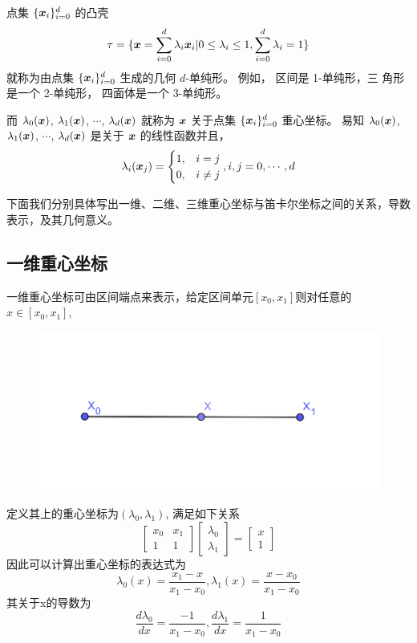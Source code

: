 点集 $\{{\boldsymbol x}_i\}_{i=0}^d$ 的凸壳
\begin{equation}
	\tau = \{{\boldsymbol x} = \sum_{i=0}^{d}\lambda_i{\boldsymbol x}_i | 0\leq \lambda_i \leq
	1, \sum_{i=0}^d\lambda_i = 1\}
\end{equation}
就称为由点集 $\{{\boldsymbol x}_i\}_{i=0}^d$ 生成的几何 $d$-单纯形。 例如， 区间是 1-单纯形，三
角形是一个 2-单纯形， 四面体是一个 3-单纯形。

而 $\lambda_0({\boldsymbol x})$, $\lambda_1({\boldsymbol x})$, $\cdots$, $\lambda_{d}({\boldsymbol x})$ 就称为
${\boldsymbol x}$
关于点集 $\{{\boldsymbol x}_i\}_{i=0}^d$ 重心坐标。  易知 $\lambda_0({\boldsymbol x})$,
$\lambda_1({\boldsymbol x})$, $\cdots$, $\lambda_{d}({\boldsymbol x})$ 是关于 ${\boldsymbol x}$ 的线性函数并且，
\begin{equation}
	\lambda_i({\boldsymbol x}_j) = 
	\begin{cases}
		1, & i = j\\
		0, & i\not= j
	\end{cases}, 
	i, j = 0, \cdots, d
\end{equation}

下面我们分别具体写出一维、二维、三维重心坐标与笛卡尔坐标之间的关系，导数表示，及其几何意义。
\subsection{一维重心坐标}
一维重心坐标可由区间端点来表示，给定区间单元$[x_0,x_1]$则对任意的$x \in [x_0,x_1]$,
\begin{figure}[H]
	\centering
	\includegraphics[width=0.7\linewidth]{figures/intervalbc}
	\label{fig:intervalbc}
\end{figure}
定义其上的重心坐标为$(\lambda_0,\lambda_1)$, 满足如下关系
\begin{equation}
	\left[\begin{array}{cc}
		x_{0} & x_{1} \\
		1 & 1
	\end{array}\right]\left[\begin{array}{l}
		\lambda_{0} \\
		\lambda_{1}
	\end{array}\right]=\left[\begin{array}{l}
		x \\
		1
	\end{array}\right]
\end{equation}
因此可以计算出重心坐标的表达式为
\begin{equation}
	\lambda_{0}(x)=\frac{x_{1}-x}{x_{1}-x_{0}}, \lambda_{1}(x)=\frac{x-x_{0}}{x_{1}-x_{0}}
\end{equation}
其关于x的导数为
\begin{equation}
	\frac{d \lambda_{0}}{d x}=\frac{-1}{x_{1}-x_{0}}, \frac{d \lambda_{1}}{d x}=\frac{1}{x_{1}-x_{0}}
\end{equation}

